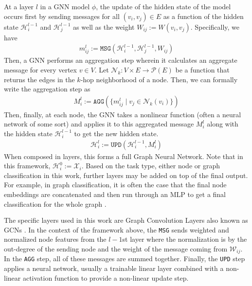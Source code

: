 At a layer $l$ in a GNN model $\phi$, the update of the hidden state of the model occurs first by sending messages for all $(v_{i}, v_{j}) \in E$ as a function of the hidden state $\mathcal{H}_{i}^{l-1}$ and $\mathcal{H}_{j}^{l-1}$ as well as the weight $W_{ij} := W(v_{i}, v_{j})$. Specifically, we have
\begin{align*}
  m_{ij}^{l} := \mathtt{MSG}(\mathcal{H}_{i}^{l-1}, \mathcal{H}_{j}^{l-1}, W_{ij})
\end{align*}
Then, a GNN performs an aggregation step wherein it calculates an aggregate message for every vertex $v \in V$. Let $\mathcal{N}_{k} : V \times E \rightarrow \mathcal{P}(E)$ be a function that returns the edges in the $k$-hop neighborhood of a node. Then, we can formally write the aggregation step as
\begin{align*}
  M_{i}^{l} := \mathtt{AGG}(\{m_{ij}^{l} \mid v_{j} \in \mathcal{N}_{k}(v_{i})\})
\end{align*}
Then, finally, at each node, the GNN takes a nonlinear function (often a neural network of some sort) and applies it to this aggregated message $M_{i}^{l}$ along with the hidden state $\mathcal{H}_{i}^{l-1}$ to get the new hidden state.
\begin{align*}
  \mathcal{H}_{i}^{l} := \mathtt{UPD}(\mathcal{H}_{i}^{l-1}, M_{i}^{l})
\end{align*}
When composed in layers, this forms a full Graph Neural Network. Note that in this framework, $\mathcal{H}_{i}^{0} := \mathcal{X}_{i}$. Based on the task type, either node or graph classification in this work, further layers may be added on top of the final output. For example, in graph classification, it is often the case that the final node embeddings are concatenated and then run through an MLP to get a final classification for the whole graph \cite{ying_gnnexplainer_2019}.

The specific layers used in this work are Graph Convolution Layers also known as GCNs \cite{kipf_semi-supervised_2017}. In the context of the framework above, the \verb|MSG| sends weighted and normalized node features from the $l-1$st layer where the normalization is by the out-degree of the sending node and the weight of the message coming from $\mathcal{W}_{ij}$. In the \verb|AGG| step, all of these messages are summed together. Finally, the \verb|UPD| step applies a neural network, usually a trainable linear layer combined with a non-linear activation function to provide a non-linear update step.

